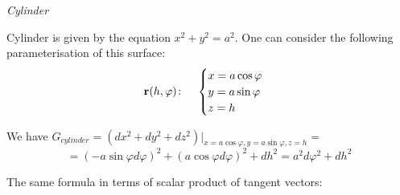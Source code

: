 \documentclass[12pt]{article}
\theoremstyle{theorem}
\numberwithin{equation}{section}
\begin{document}
\medskip

         \medskip


       \centerline  {\it Cylinder}


  Cylinder is given by the equation $x^2+y^2=a^2$. One can consider the following
parameterisation
 of this surface:
\begin{equation}\label{surface1}
  {\bf r}(h,\varphi)\colon\quad
  \begin{cases}
  x=a\cos\varphi\\
  y=a\sin\varphi\\
  z=h\\
  \end{cases}
\end{equation}

\medskip

We have   $G_{cylinder}=\left(dx^2+dy^2+dz^2\right)\big\vert_{x=a\cos\varphi,y=a\sin\varphi,z=h}=$
        \begin{equation}\label{firtsquadraticformcylinder(diff)}
               =(-a\sin\varphi d\varphi)^2+(a\cos\varphi d\varphi)^2+dh^2=a^2d\varphi^2+dh^2
        \end{equation}

The same formula in terms of scalar product of tangent vectors:
\end{document}
